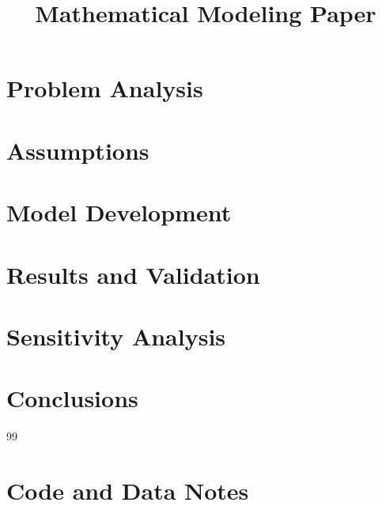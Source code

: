 \documentclass[12pt,a4paper]{article}
\title{Mathematical Modeling Paper}
\author{}
\date{}
\begin{document}
\maketitle
\begin{abstract}
\end{abstract}
\tableofcontents
\section{Problem Analysis}
\section{Assumptions}
\section{Model Development}
\section{Results and Validation}
\section{Sensitivity Analysis}
\section{Conclusions}
\begin{thebibliography}{99}
\end{thebibliography}
\appendix
\section{Code and Data Notes}
\end{document}
